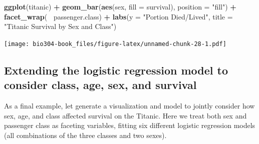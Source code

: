 \documentclass[]{book}
\newenvironment{Shaded}{\begin{snugshade}}{\end{snugshade}}
\newcommand{\DataTypeTok}[1]{\textcolor[rgb]{0.13,0.29,0.53}{#1}}
\newcommand{\FloatTok}[1]{\textcolor[rgb]{0.00,0.00,0.81}{#1}}
\newcommand{\KeywordTok}[1]{\textcolor[rgb]{0.13,0.29,0.53}{\textbf{#1}}}
\newcommand{\NormalTok}[1]{#1}
\newcommand{\OperatorTok}[1]{\textcolor[rgb]{0.81,0.36,0.00}{\textbf{#1}}}
\newcommand{\StringTok}[1]{\textcolor[rgb]{0.31,0.60,0.02}{#1}}
\theoremstyle{definition}
\theoremstyle{definition}
\theoremstyle{definition}
\theoremstyle{remark}
\begin{document}
\begin{Shaded}
\begin{Highlighting}[]
\KeywordTok{ggplot}\NormalTok{(titanic) }\OperatorTok{+}
\StringTok{  }\KeywordTok{geom_bar}\NormalTok{(}\KeywordTok{aes}\NormalTok{(sex, }\DataTypeTok{fill =}\NormalTok{ survival), }\DataTypeTok{position =} \StringTok{"fill"}\NormalTok{) }\OperatorTok{+}\StringTok{ }
\StringTok{  }\KeywordTok{facet_wrap}\NormalTok{(}\OperatorTok{~}\StringTok{ }\NormalTok{passenger.class) }\OperatorTok{+}\StringTok{ }
\StringTok{  }\KeywordTok{labs}\NormalTok{(}\DataTypeTok{y =} \StringTok{"Portion Died/Lived"}\NormalTok{, }\DataTypeTok{title =} \StringTok{"Titanic Survival by Sex and Class"}\NormalTok{)}
\end{Highlighting}
\end{Shaded}

\texttt{[image: bio304-book\_files/figure-latex/unnamed-chunk-28-1.pdf]}

\hypertarget{extending-the-logistic-regression-model-to-consider-class-age-sex-and-survival}{%
\subsection{Extending the logistic regression model to consider class,
age, sex, and
survival}\label{extending-the-logistic-regression-model-to-consider-class-age-sex-and-survival}}

As a final example, let generate a visualization and model to jointly
consider how sex, age, and class affected survival on the Titanic. Here
we treat both sex and passenger class as faceting variables, fitting six
different logistic regression models (all combinations of the three
classes and two sexes).

\begin{Shaded}
\end{Shaded}
\end{document}
